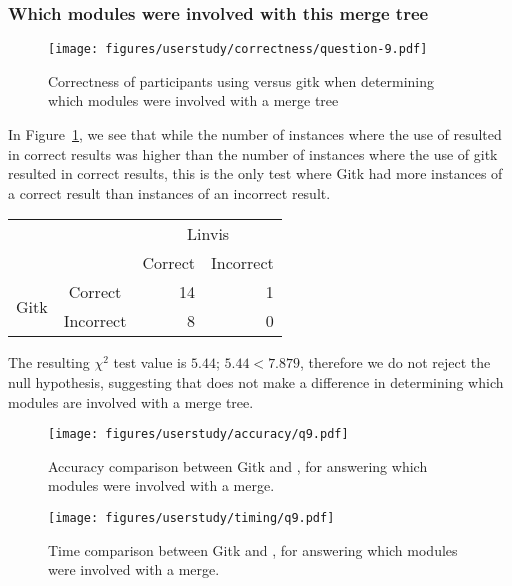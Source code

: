 \subsubsection{Which modules were involved with this merge tree}
\label{ssub:which_modules_were_involved_with_this_merge_tree}

\begin{figure}[htpb]
  \centering
  \texttt{[image: figures/userstudy/correctness/question-9.pdf]}
  \caption{Correctness of participants using \tool versus gitk when
    determining which modules were involved with a merge tree}
  \label{fig:q_9_correctness}
\end{figure}

In Figure~\ref{fig:q_9_correctness}, we see that while the number of
instances where the use of \tool resulted in correct results was higher
than the number of instances where the use of gitk resulted in correct
results, this is the only test where Gitk had more instances of a
correct result than instances of an incorrect result.

\begin{center}
  \begin{tabular}{cc|rr}
                            &           & \multicolumn{2}{c}{Linvis}\\
                            &           & Correct                      & Incorrect\\\hline
    \multirow{2}{*}{Gitk}   & Correct   & 14                           & 1\\
                            & Incorrect & 8                            & 0\\
  \end{tabular}
\end{center}

The resulting $\chi^2$ test value is $5.44$; $5.44 < 7.879$, therefore
we do not reject the null hypothesis, suggesting that \tool does not
make a difference in determining which modules are involved with a merge
tree.

\begin{figure}[htpb]
  \centering
  \texttt{[image: figures/userstudy/accuracy/q9.pdf]}
  \caption{Accuracy comparison between Gitk and \tool, for answering
    which modules were involved with a merge.}
  \label{fig:q9_accuracy}
\end{figure}

\begin{figure}[htpb]
  \centering
  \texttt{[image: figures/userstudy/timing/q9.pdf]}
  \caption{Time comparison between Gitk and \tool, for answering which
    modules were involved with a merge.}
  \label{fig:q9_timing}
\end{figure}

